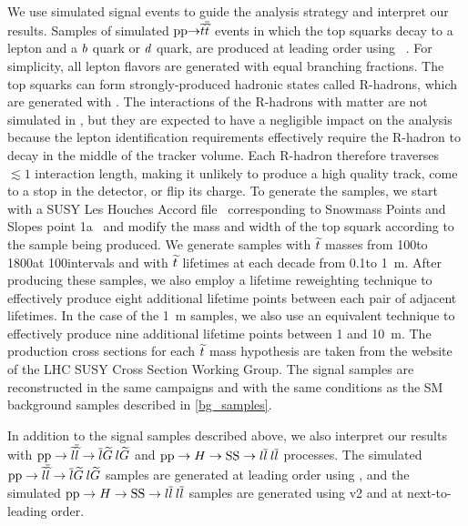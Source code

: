 We use simulated signal events to guide the analysis strategy and interpret our results. Samples of simulated $\mathrm{p}\mathrm{p} {\to} \widetilde{t} \overline{\widetilde{t}}$ events in which the top squarks decay to a lepton and a $b$ quark or $d$ quark, are produced at leading order using ~\cite{PYTHIA8}. For simplicity, all lepton flavors are generated with equal branching fractions. The top squarks can form strongly-produced hadronic states called R-hadrons, which are generated with \PYTHIA. The interactions of the R-hadrons with matter are not simulated in \GEANTfour, but they are expected to have a negligible impact on the analysis because the lepton identification requirements effectively require the R-hadron to decay in the middle of the tracker volume. Each R-hadron therefore traverses $\lesssim1$ interaction length, making it unlikely to produce a high quality track, come to a stop in the detector, or flip its charge. To generate the samples, we start with a SUSY Les Houches Accord file~\cite{LesHouches} corresponding to Snowmass Points and Slopes point 1a~\cite{snowmass_points_slopes} and modify the mass and width of the top squark according to the sample being produced. We generate samples with $\widetilde{t}$ masses from 100\GeV to 1800\GeV at 100\GeV intervals and with $\widetilde{t}$ lifetimes at each decade from 0.1\mm to 1~m. After producing these samples, we also employ a lifetime reweighting technique to effectively produce eight additional lifetime points between each pair of adjacent lifetimes. In the case of the 1~m samples, we also use an equivalent technique to effectively produce nine additional lifetime points between 1 and 10~m.  The production cross sections for each $\widetilde{t}$ mass hypothesis are taken from the website of the LHC SUSY Cross Section Working Group. The signal samples are reconstructed in the same campaigns and with the same conditions as the SM background samples described in \ref{bg_samples}.

In addition to the signal samples described above, we also interpret our results with $\mathrm{p}\mathrm{p} \to \widetilde{l}\overline{\widetilde{l}} \to \overline{l}\widetilde{G}\:l\widetilde{G}$ and $\mathrm{p}\mathrm{p} \to H \to \mathrm{S}\mathrm{S} \to l\overline{l}\:l\overline{l}$ processes. The simulated $\mathrm{p}\mathrm{p} \to \widetilde{l}\overline{\widetilde{l}} \to \overline{l}\widetilde{G}\:l\widetilde{G}$ samples are generated at leading order using \MGvATNLO, and the simulated $\mathrm{p}\mathrm{p} \to H \to \mathrm{S}\mathrm{S} \to l\overline{l}\:l\overline{l}$  samples are generated using \POWHEG v2 and  at next-to-leading order.

\pagebreak